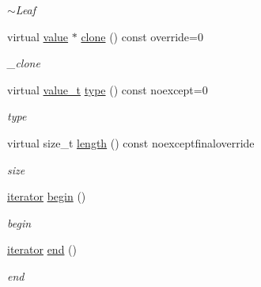 \begin{DoxyCompactItemize}
\begin{DoxyCompactList}\small\item\em $\sim$\+Leaf \end{DoxyCompactList}\item 
virtual \hyperlink{classformat_1_1value_aa6b85823936bf7b8ab78d3f8d443c00d}{value} $\ast$ \hyperlink{classformat_1_1leaf_a861972c1866ab17d00e4b950d33d4ced}{clone} () const override=0
\begin{DoxyCompactList}\small\item\em \+\_\+clone \end{DoxyCompactList}\item 
virtual \hyperlink{classformat_1_1value_aa0334be06389a7b14af485fa0cd3aa21}{value\+\_\+t} \hyperlink{classformat_1_1leaf_ac29de88719f2da4d262255ef8a234ced}{type} () const noexcept=0
\begin{DoxyCompactList}\small\item\em type \end{DoxyCompactList}\item 
virtual size\+\_\+t \hyperlink{classformat_1_1leaf_ab14acf7466a4a603d4558419d36fe75a}{length} () const noexceptfinaloverride
\begin{DoxyCompactList}\small\item\em size \end{DoxyCompactList}\item 
\hyperlink{classformat_1_1leaf_1_1iterator}{iterator} \hyperlink{classformat_1_1leaf_af4188fcb27d2c56c1b5af0e5db9fc603}{begin} ()
\begin{DoxyCompactList}\small\item\em begin \end{DoxyCompactList}\item 
\hyperlink{classformat_1_1leaf_1_1iterator}{iterator} \hyperlink{classformat_1_1leaf_a95970b9f786076d77448f12c0daa99e2}{end} ()
\begin{DoxyCompactList}\small\item\em end \end{DoxyCompactList}\end{DoxyCompactItemize}

